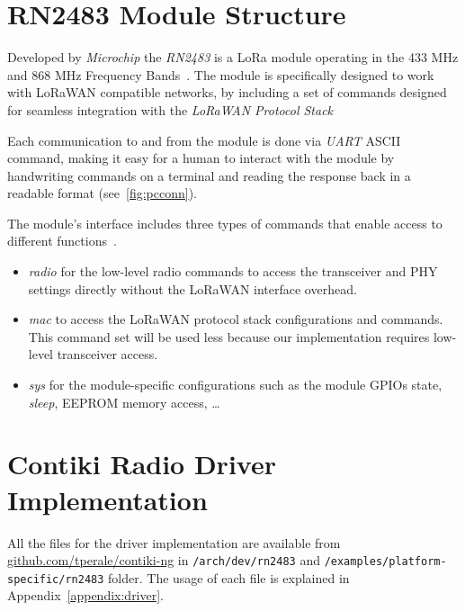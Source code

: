 \section{RN2483 Module Structure}

Developed by \emph{Microchip} the \emph{RN2483} is a LoRa module operating in
the 433 MHz and 868 MHz Frequency Bands~\cite{microchip:rn2483}.
The module is specifically designed to work with LoRaWAN compatible networks,
by including a set of commands designed for seamless integration with the
\emph{LoRaWAN Protocol Stack}

Each communication to and from the module is done via \emph{UART} ASCII command,
making it easy for a human to interact with the module by handwriting commands
on a terminal and reading the response back in a readable format
(see~\ref{fig:pcconn}).



The module's interface includes three types of commands that enable access to
different functions~\cite{microchip:reference}.

\begin{itemize}
  \item \emph{radio} for the low-level radio commands to access the transceiver
    and PHY settings directly without the LoRaWAN interface overhead.
  \item \emph{mac} to access the LoRaWAN protocol stack configurations and
    commands. This command set will be used less because our implementation
    requires low-level transceiver access.
  \item \emph{sys} for the module-specific configurations such as the module
    GPIOs state, \emph{sleep}, EEPROM memory access, \ldots
\end{itemize}

\section{Contiki Radio Driver Implementation}

All the files for the driver implementation are available from
\href{https://github.com/tperale/contiki-ng}{github.com/tperale/contiki-ng}
in \lstinline{/arch/dev/rn2483} and
\lstinline{/examples/platform-specific/rn2483} folder.
The usage of each file is explained in Appendix~\ref{appendix:driver}.

\paragraph{}

